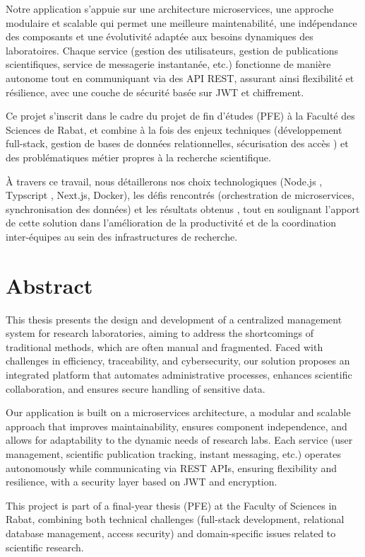 \documentclass{rapportPfe}
\begin{document}
Notre application s’appuie sur une architecture microservices, une approche modulaire et scalable qui permet une meilleure maintenabilité, une indépendance des composants et une évolutivité adaptée aux besoins dynamiques des laboratoires. Chaque service (gestion des utilisateurs, gestion de publications scientifiques, service de messagerie instantanée, etc.) fonctionne de manière autonome tout en communiquant via des API REST, assurant ainsi flexibilité et résilience, avec une couche de sécurité basée sur JWT et chiffrement.

Ce projet s’inscrit dans le cadre du projet de fin d’études (PFE) à la Faculté des Sciences de Rabat, et combine à la fois des enjeux techniques (développement full-stack, gestion de bases de données relationnelles, sécurisation des accès ) et des problématiques métier propres à la recherche scientifique.

À travers ce travail, nous détaillerons nos choix technologiques (Node.js , Typscript , Next.js, Docker), les défis rencontrés (orchestration de microservices, synchronisation des données) et les résultats obtenus , tout en soulignant l’apport de cette solution dans l’amélioration de la productivité et de la coordination inter-équipes au sein des infrastructures de recherche.

\chapter*{Abstract}
This thesis presents the design and development of a centralized management system for research laboratories, aiming to address the shortcomings of traditional methods, which are often manual and fragmented. Faced with challenges in efficiency, traceability, and cybersecurity, our solution proposes an integrated platform that automates administrative processes, enhances scientific collaboration, and ensures secure handling of sensitive data.

Our application is built on a microservices architecture, a modular and scalable approach that improves maintainability, ensures component independence, and allows for adaptability to the dynamic needs of research labs. Each service (user management, scientific publication tracking, instant messaging, etc.) operates autonomously while communicating via REST APIs, ensuring flexibility and resilience, with a security layer based on JWT and encryption.

This project is part of a final-year thesis (PFE) at the Faculty of Sciences in Rabat, combining both technical challenges (full-stack development, relational database management, access security) and domain-specific issues related to scientific research.
\end{document}
